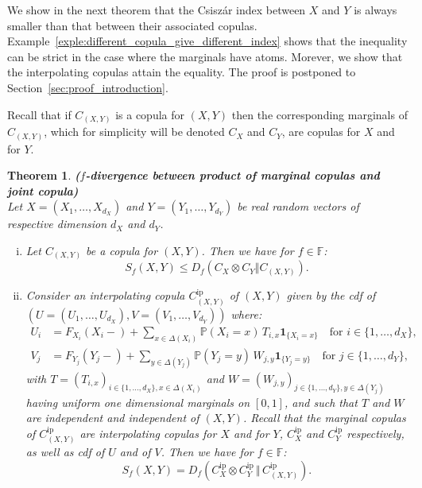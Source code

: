 \documentclass[12pt]{article}
\newcommand{\F}{{\mathbb F}}
\renewcommand{\P}{{\mathbb P}}
\newcommand{\ind}{\mathbf{1}}
\newcommand{\Cip}{C^\mathrm{ip}}
\theoremstyle{plain}
\newtheorem{theo}{Theorem}
\theoremstyle{remark}
\begin{document}
We show in the next theorem that the Csiszár  index between $X$
and      $Y$  is always smaller than that  between    their     associated      copulas. Example~\ref{exple:different_copula_give_different_index} shows that the inequality can be strict in the case where the marginals  have atoms. Morever, we show that the interpolating copulas attain the equality. The proof is postponed to Section~\ref{sec:proof_introduction}.  

Recall that if  $C_{(X,Y)}$ is a copula for  $(X,Y)$ then the corresponding marginals  of  $C_{(X,Y)}$,  which for simplicity will be denoted $C_X$ and
$C_Y$,   are copulas for $X$ and
for $Y$. 

\bigskip

\begin{theo}{\bf ($f$-divergence between product of marginal copulas and joint copula)}
\label{thm:interpolating_minimise_fdiv} \\
%
Let $X=(X_1, \ldots, X_{d_X})$
and $Y=(Y_1, \ldots, Y_{d_Y})$ be real random
vectors of respective dimension $d_X$ and $d_Y$.

\begin{enumerate}[(i)]
   \item \label{it:copu-majoD}
Let $C_{(X,Y)}$ be a copula for  $(X,Y)$. Then we have for $f \in \F$:
\begin{equation}
\label{eq:ineq-cop-Csiszar}
    S_f(X,Y) \leq D_f(C_X \otimes C_Y \Vert C_{(X,Y)}). 
\end{equation}

\item \label{it:copu-equalD} Consider an interpolating copula
  $\Cip_{(X,Y)}$ of $(X,Y)$ given by the cdf of $(U=(U_1, \ldots, U_{d_X}),V=(V_1, \ldots, V_{d_Y}))$ where:
  \begin{align}
\label{eq:def-U}
    U_i&=F_{X_i}(X_i-) + \sum_{x\in \Delta(X_i)} \P(X_i=x) 
         \,  T_{i,x} \ind_{\{X_i=x\}} \quad\text{for $i\in \{1, \ldots, d_X\}$},\\
    \label{eq:def-V}
V_j&= F_{Y_j}(Y_j-) + \sum_{y\in \Delta(Y_j)} \P(Y_j=y) 
     \,  W_{j,y} \ind_{\{Y_j=y\}} \quad\text{for $j\in \{1, \ldots, d_Y\}$},
  \end{align}
  with  $T=(T_{i,x})_{i\in \{1,  \ldots, d_X\},  x\in \Delta(X_i)}$  and
  $W=(W_{j,y})_{j\in  \{1,  \ldots,  d_Y\},  y\in  \Delta(Y_j)}$  having
  uniform one dimensional  marginals on $[0, 1]$, and such  that $T$ and
  $W$  are independent  and  independent of  $(X,Y)$.   Recall that  the
  marginal  copulas   of  $\Cip_{(X,Y)}$  are 
  interpolating copulas for $X$ and for $Y$, $\Cip_X$ and $\Cip_Y$ respectively, as well as  cdf of $U$ and of
  $V$.  Then we have for $f \in \F$:
\[
        S_f(X,Y) = D_f(\Cip_X \otimes \Cip_Y \, \Vert\,  \Cip_{(X,Y)}). 
\]



\end{enumerate}
\end{theo}
\end{document}
